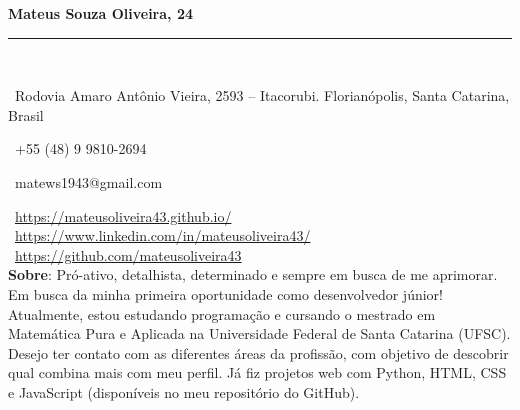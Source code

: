 \documentclass[a4paper,10pt]{article}
\makeatletter
\newcommand{\profissional}{Mateus Souza Oliveira}
\newcommand{\idade}{24}
\newcommand{\Endereco}{Rodovia Amaro Antônio Vieira, 2593 -- Itacorubi. Florianópolis, Santa Catarina, Brasil}
\newcommand{\telefone}{+55 (48) 9 9810-2694}
\newcommand{\email}{matews1943@gmail.com}
\newcommand{\sobre}{
    Pró-ativo, detalhista, determinado e sempre em busca de me aprimorar. Em busca da minha primeira oportunidade como desenvolvedor júnior! Atualmente, estou estudando programação e cursando o mestrado em Matemática Pura e Aplicada na Universidade Federal de Santa Catarina (UFSC). Desejo ter contato com as diferentes áreas da profissão, com objetivo de descobrir qual combina mais com meu perfil. Já fiz projetos web com Python, HTML, CSS e JavaScript (disponíveis no meu repositório do GitHub).
    \vspace{0\baselineskip}
}
\makeatother
\begin{document}
	
	\noindent
	\hfill
	\begin{minipage}{0.65\linewidth}
		\Huge{\bf \profissional, \idade}\\\vspace{-1.75\baselineskip}
		
		\noindent\rule{\textwidth}{1.5pt} {\ }\\\vspace{-1.8\baselineskip}
		
		\large{
		\faMapMarker \ \Endereco \\
		\begin{minipage}{0.5\linewidth}
			\faWhatsapp \ \telefone
		\end{minipage}
		\begin{minipage}{0.5\linewidth}
			\faEnvelope \ \email
		\end{minipage}
		\faLink \ \url{https://mateusoliveira43.github.io/}\\
		\faLinkedinSquare \ \url{https://www.linkedin.com/in/mateusoliveira43/}\\
		\faGithub \ \url{https://github.com/mateusoliveira43} \\
		\vfill
		\textbf{Sobre}: \sobre
		}
	\end{minipage}
\end{document}
